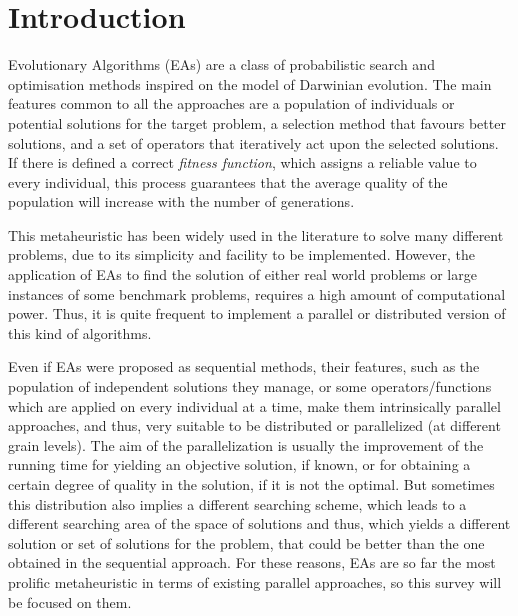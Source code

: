\documentclass{article}
\begin{document}
%


\section{Introduction}
\label{sec:intro}

Evolutionary Algorithms (EAs) \cite{EAs_Back96} are a class of probabilistic search and optimisation methods inspired on the model of Darwinian evolution.
The main features common to all the approaches are a population of individuals or potential solutions for the target problem, a selection method that favours better solutions, and a set of operators that iteratively act upon the selected solutions. If there is defined a correct {\em fitness function}, which assigns a reliable value to every individual, this process guarantees that the average quality of the population will increase with the number of generations.

This metaheuristic has been widely used in the literature to solve many different problems, due to its simplicity and facility to be implemented. However, the application of EAs to find the solution of either real world problems or large instances of some benchmark problems, requires a high amount of computational power. Thus, it is quite frequent to implement a parallel or distributed version of this kind of algorithms.

Even if EAs were proposed as sequential methods, their features, such as the population of independent solutions they manage, or some operators/functions which are applied on every individual at a time, make them intrinsically parallel approaches, and thus, very suitable to be distributed or parallelized (at different grain levels).
The aim of the parallelization is usually the improvement of the running time for yielding an objective solution, if known, or for obtaining a certain degree of quality in the solution, if it is not the optimal. But sometimes this distribution also implies a different searching scheme, which leads to a different searching area of the space of solutions and thus, which yields a different solution or set of solutions for the problem, that could be better than the one obtained in the sequential approach.
For these reasons, EAs are so far the most prolific metaheuristic in
terms of existing parallel approaches, so this survey will be focused on them.
\end{document}
